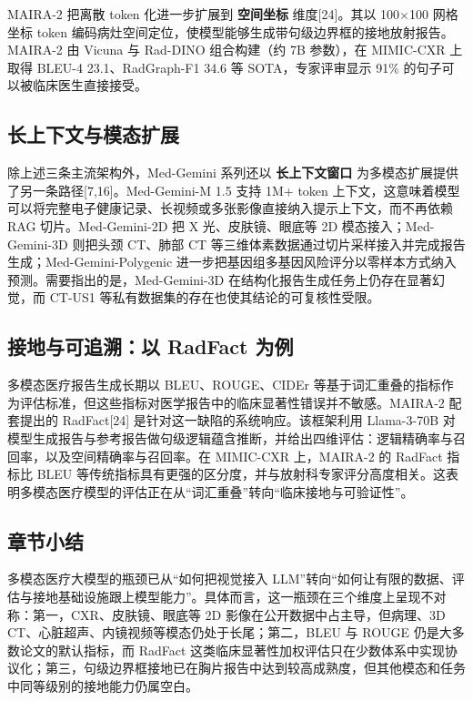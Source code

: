 MAIRA-2 把离散 token 化进一步扩展到 \textbf{空间坐标} 维度[24]。其以 100$\times$100 网格坐标 token 编码病灶空间定位，使模型能够生成带句级边界框的接地放射报告。MAIRA-2 由 Vicuna 与 Rad-DINO 组合构建（约 7B 参数），在 MIMIC-CXR 上取得 BLEU-4 23.1、RadGraph-F1 34.6 等 SOTA，专家评审显示 91\% 的句子可以被临床医生直接接受。

\subsection{长上下文与模态扩展}

除上述三条主流架构外，Med-Gemini 系列还以 \textbf{长上下文窗口} 为多模态扩展提供了另一条路径[7,16]。Med-Gemini-M 1.5 支持 1M+ token 上下文，这意味着模型可以将完整电子健康记录、长视频或多张影像直接纳入提示上下文，而不再依赖 RAG 切片。Med-Gemini-2D 把 X 光、皮肤镜、眼底等 2D 模态接入；Med-Gemini-3D 则把头颈 CT、肺部 CT 等三维体素数据通过切片采样接入并完成报告生成；Med-Gemini-Polygenic 进一步把基因组多基因风险评分以零样本方式纳入预测。需要指出的是，Med-Gemini-3D 在结构化报告生成任务上仍存在显著幻觉，而 CT-US1 等私有数据集的存在也使其结论的可复核性受限。

\subsection{接地与可追溯：以 RadFact 为例}

多模态医疗报告生成长期以 BLEU、ROUGE、CIDEr 等基于词汇重叠的指标作为评估标准，但这些指标对医学报告中的临床显著性错误并不敏感。MAIRA-2 配套提出的 RadFact[24] 是针对这一缺陷的系统响应。该框架利用 Llama-3-70B 对模型生成报告与参考报告做句级逻辑蕴含推断，并给出四维评估：逻辑精确率与召回率，以及空间精确率与召回率。在 MIMIC-CXR 上，MAIRA-2 的 RadFact 指标比 BLEU 等传统指标具有更强的区分度，并与放射科专家评分高度相关。这表明多模态医疗模型的评估正在从“词汇重叠”转向“临床接地与可验证性”。

\subsection{章节小结}

多模态医疗大模型的瓶颈已从“如何把视觉接入 LLM”转向“如何让有限的数据、评估与接地基础设施跟上模型能力”。具体而言，这一瓶颈在三个维度上呈现不对称：第一，CXR、皮肤镜、眼底等 2D 影像在公开数据中占主导，但病理、3D CT、心脏超声、内镜视频等模态仍处于长尾；第二，BLEU 与 ROUGE 仍是大多数论文的默认指标，而 RadFact 这类临床显著性加权评估只在少数体系中实现协议化；第三，句级边界框接地已在胸片报告中达到较高成熟度，但其他模态和任务中同等级别的接地能力仍属空白。

